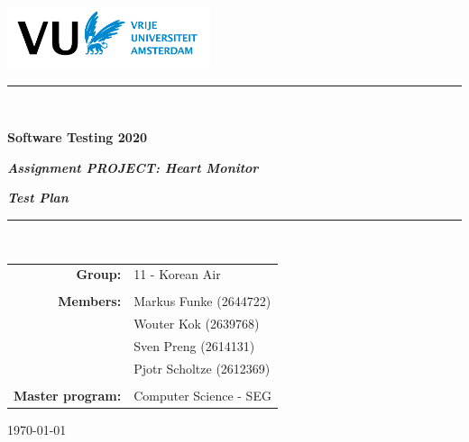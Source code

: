 \documentclass[a4paper]{article}
\begin{document}
\begin{center}
\vspace{1mm}
\includegraphics[height=18mm]{figs/VUlogo.png}

\vspace*{1.5cm}

\rule{.9\linewidth}{.6pt}\\[0.4cm]
{\huge \bfseries Software Testing 2020 \par}
\vspace{0.2cm}
{\large \bfseries \textit{Assignment PROJECT: Heart Monitor}\par}
{\large \bfseries \textit{Test Plan}\par}\vspace{0.4cm}
\rule{.9\linewidth}{.6pt}\\[1.5cm]


\vspace*{2mm}


{\large
    \begin{tabular}{rl}
    \textbf{Group:} & 11 - Korean Air \\ \\
    \textbf{Members:} & Markus Funke (2644722)  \\
                & Wouter Kok (2639768) \\
                & Sven Preng (2614131) \\
                & Pjotr Scholtze (2612369)  \\ \\
    \textbf{Master program:} & Computer Science - SEG
  \end{tabular}%
}


\vspace*{5cm}

\today\\[4cm] %
\thispagestyle{empty}
\end{center}



\tableofcontents
\thispagestyle{empty}
\clearpage


\renewcommand{\arraystretch}{1.5}
\end{document}
